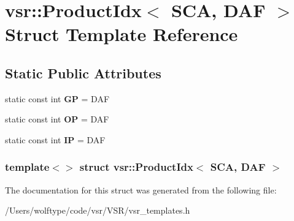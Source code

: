 \hypertarget{structvsr_1_1_product_idx_3_01_s_c_a_00_01_d_a_f_01_4}{\section{vsr\-:\-:Product\-Idx$<$ S\-C\-A, D\-A\-F $>$ Struct Template Reference}
\label{structvsr_1_1_product_idx_3_01_s_c_a_00_01_d_a_f_01_4}
}
\subsection*{Static Public Attributes}
\begin{DoxyCompactItemize}
\item 
\hypertarget{structvsr_1_1_product_idx_3_01_s_c_a_00_01_d_a_f_01_4_a41d35b3b7096438b283687fb181d3940}{static const int {\bfseries G\-P} = D\-A\-F}\label{structvsr_1_1_product_idx_3_01_s_c_a_00_01_d_a_f_01_4_a41d35b3b7096438b283687fb181d3940}

\item 
\hypertarget{structvsr_1_1_product_idx_3_01_s_c_a_00_01_d_a_f_01_4_a2da84d02dca9d3a0f4369113bb90132e}{static const int {\bfseries O\-P} = D\-A\-F}\label{structvsr_1_1_product_idx_3_01_s_c_a_00_01_d_a_f_01_4_a2da84d02dca9d3a0f4369113bb90132e}

\item 
\hypertarget{structvsr_1_1_product_idx_3_01_s_c_a_00_01_d_a_f_01_4_aba2f32ad5cf0ecc1173317d6c65ff861}{static const int {\bfseries I\-P} = D\-A\-F}\label{structvsr_1_1_product_idx_3_01_s_c_a_00_01_d_a_f_01_4_aba2f32ad5cf0ecc1173317d6c65ff861}

\end{DoxyCompactItemize}
\subsubsection*{template$<$$>$ struct vsr\-::\-Product\-Idx$<$ S\-C\-A, D\-A\-F $>$}



The documentation for this struct was generated from the following file\-:\begin{DoxyCompactItemize}
\item 
/\-Users/wolftype/code/vsr/\-V\-S\-R/vsr\-\_\-templates.\-h\end{DoxyCompactItemize}
